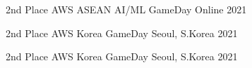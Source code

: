 



\begin{cvhonors}

  \cvhonor
    {2nd Place} %
    {AWS ASEAN AI/ML GameDay} %
    {Online} %
    {2021} %

\end{cvhonors}




\begin{cvhonors}

  \cvhonor
    {2nd Place} %
    {AWS Korea GameDay} %
    {Seoul, S.Korea} %
    {2021} %

\end{cvhonors}



\begin{cvhonors}
	
	\cvhonor
	{2nd Place} %
	{AWS Korea GameDay} %
	{Seoul, S.Korea} %
	{2021} %
	
\end{cvhonors}
